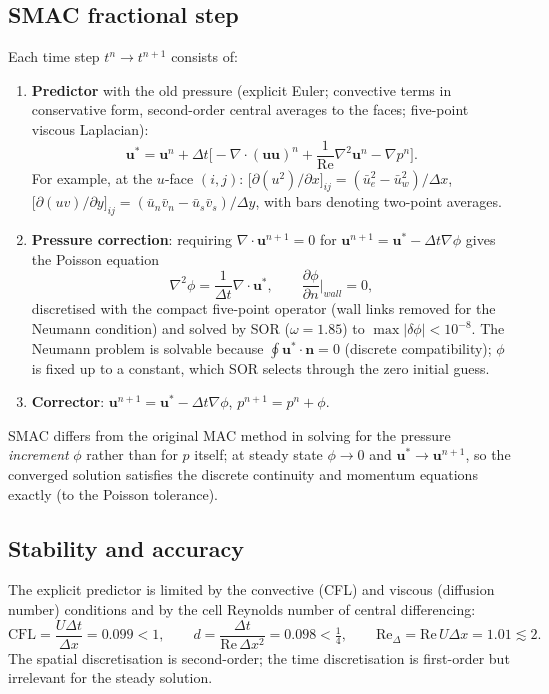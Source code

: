 \subsection{SMAC fractional step}
Each time step $t^n\to t^{n+1}$ consists of:
\begin{enumerate}
\item \textbf{Predictor} with the old pressure (explicit Euler; convective terms in conservative form, second-order central averages to the faces; five-point viscous Laplacian):
\begin{equation}\mathbf{u}^*=\mathbf{u}^n+\Delta t\Big[-\nabla\cdot(\mathbf{u}\mathbf{u})^n+\frac{1}{\mathrm{Re}}\nabla^2\mathbf{u}^n-\nabla p^n\Big].\end{equation}
For example, at the $u$-face $(i,j)$:
$\big[\partial(u^2)/\partial x\big]_{ij}=(\bar u_e^2-\bar u_w^2)/\Delta x$, $\big[\partial(uv)/\partial y\big]_{ij}=(\bar u_n\bar v_n-\bar u_s\bar v_s)/\Delta y$, with bars denoting two-point averages.
\item \textbf{Pressure correction}: requiring $\nabla\cdot\mathbf{u}^{n+1}=0$ for $\mathbf{u}^{n+1}=\mathbf{u}^*-\Delta t\nabla\phi$ gives the Poisson equation
\begin{equation}\nabla^2\phi=\frac{1}{\Delta t}\nabla\cdot\mathbf{u}^*,\qquad \frac{\partial\phi}{\partial n}\Big|_{wall}=0, \label{eq:pp}\end{equation}
discretised with the compact five-point operator (wall links removed for the Neumann condition) and solved by SOR ($\omega=1.85$) to $\max|\delta\phi|<10^{-8}$. The Neumann problem is solvable because $\oint\mathbf{u}^*\cdot\mathbf{n}=0$ (discrete compatibility); $\phi$ is fixed up to a constant, which SOR selects through the zero initial guess.
\item \textbf{Corrector}: $\mathbf{u}^{n+1}=\mathbf{u}^*-\Delta t\nabla\phi$, \;$p^{n+1}=p^n+\phi$.
\end{enumerate}
SMAC differs from the original MAC method in solving for the pressure \emph{increment} $\phi$ rather than for $p$ itself; at steady state $\phi\to0$ and $\mathbf{u}^*\to\mathbf{u}^{n+1}$, so the converged solution satisfies the discrete continuity and momentum equations exactly (to the Poisson tolerance).

\subsection{Stability and accuracy}
The explicit predictor is limited by the convective (CFL) and viscous (diffusion number) conditions and by the cell Reynolds number of central differencing:
\begin{equation}
\mathrm{CFL}=\frac{U\Delta t}{\Delta x}=0.099<1,\qquad d=\frac{\Delta t}{\mathrm{Re}\,\Delta x^2}=0.098<\tfrac14,\qquad \mathrm{Re}_\Delta=\mathrm{Re}\,U\Delta x=1.01\lesssim2 .
\end{equation}
The spatial discretisation is second-order; the time discretisation is first-order but irrelevant for the steady solution.

